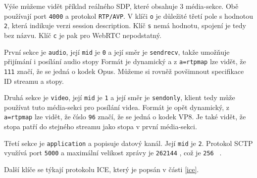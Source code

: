Výše můžeme vidět příklad reálného SDP, které obsahuje 3 média-sekce. Obě
používají port \texttt{4000} a protokol \texttt{RTP/AVP}. V
klíči \texttt{o} je důležité třetí pole s hodnotou
\texttt{2}, která indikuje verzi session description. Klíč
\texttt{s} nemá hodnotu, spojení je tedy bez názvu. Klíč
\texttt{c} je pak pro WebRTC nepodstatný.

První sekce je \texttt{audio}, její \texttt{mid} je
\texttt{0} a její směr je \texttt{sendrecv}, takže umožňuje
přijímání i posílání audio stopy Formát je dynamický a z
\texttt{a=rtpmap} lze vidět, že \texttt{111} značí, že se
jedná o kodek Opus. Můžeme si rovněž povšimnout specifikace ID streamu a stopy.

Druhá sekce je \texttt{video}, její \texttt{mid} je
\texttt{1} a její směr je \texttt{sendonly}, klient tedy
může používat tuto média-sekci pro posílání videa. Formát je opět dynamický,
z \texttt{a=rtpmap} lze vidět, že číslo \texttt{96} značí,
že se jedná o kodek VP8. Je také vidět, že stopa patří do stejného streamu jako
stopa v první média-sekci.

Třetí sekce je \texttt{application} a popisuje datový kanál. Její
\texttt{mid} je \texttt{2}. Protokol SCTP využívá port
\texttt{5000} a maximální velikost zprávy je \texttt{262144}
\si{\byte}, což je \texttt{256} \si{\kibi\byte}.

Další klíče se týkají protokolu ICE, který je popsán v části \ref{ice}.
